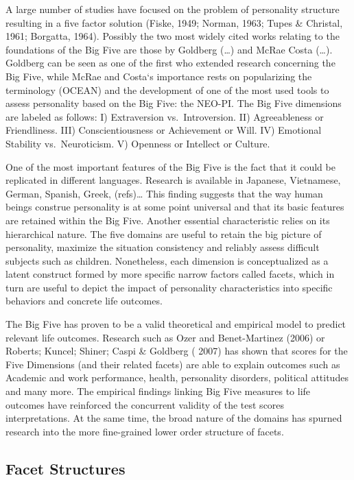 \documentclass[,man]{apa6}
\theoremstyle{definition}
\theoremstyle{definition}
\theoremstyle{definition}
\theoremstyle{remark}
\begin{document}
A large number of studies have focused on the problem of personality
structure resulting in a five factor solution (Fiske, 1949; Norman,
1963; Tupes \& Christal, 1961; Borgatta, 1964). Possibly the two most
widely cited works relating to the foundations of the Big Five are those
by Goldberg (\ldots{}) and McRae Costa (\ldots{}). Goldberg can be seen
as one of the first who extended research concerning the Big Five, while
McRae and Costa`s importance rests on popularizing the terminology
(OCEAN) and the development of one of the most used tools to assess
personality based on the Big Five: the NEO-PI. The Big Five dimensions
are labeled as follows: I) Extraversion vs.~Introversion. II)
Agreeableness or Friendliness. III) Conscientiousness or Achievement or
Will. IV) Emotional Stability vs.~Neuroticism. V) Openness or Intellect
or Culture.

One of the most important features of the Big Five is the fact that it
could be replicated in different languages. Research is available in
Japanese, Vietnamese, German, Spanish, Greek, (refs)\ldots{} This
finding suggests that the way human beings construe personality is at
some point universal and that its basic features are retained within the
Big Five. Another essential characteristic relies on its hierarchical
nature. The five domains are useful to retain the big picture of
personality, maximize the situation consistency and reliably assess
difficult subjects such as children. Nonetheless, each dimension is
conceptualized as a latent construct formed by more specific narrow
factors called facets, which in turn are useful to depict the impact of
personality characteristics into specific behaviors and concrete life
outcomes.

The Big Five has proven to be a valid theoretical and empirical model to
predict relevant life outcomes. Research such as Ozer and Benet-Martinez
(2006) or Roberts; Kuncel; Shiner; Caspi \& Goldberg ( 2007) has shown
that scores for the Five Dimensions (and their related facets) are able
to explain outcomes such as Academic and work performance, health,
personality disorders, political attitudes and many more. The empirical
findings linking Big Five measures to life outcomes have reinforced the
concurrent validity of the test scores interpretations. At the same
time, the broad nature of the domains has spurned research into the more
fine-grained lower order structure of facets.

\hypertarget{facet-structures}{%
\subsection{Facet Structures}\label{facet-structures}}
\end{document}
